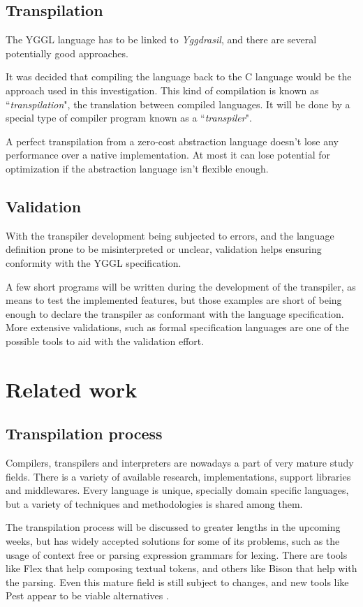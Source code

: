 \documentclass[runningheads]{llncs}
\begin{document}
\subsection{Transpilation}
The YGGL language has to be linked to \textit{Yggdrasil}, and there are several potentially good approaches.
\par It was decided that compiling the language back to the C language would be the approach used in this investigation. This kind of compilation is known as ``\textit{transpilation}", the translation between compiled languages. It will be done by a special type of compiler program known as a ``\textit{transpiler}".
\par A perfect transpilation from a zero-cost abstraction language doesn't lose any performance over a native implementation. At most it can lose potential for optimization if the abstraction language isn't flexible enough.
\subsection{Validation}
With the transpiler development being subjected to errors, and the language definition prone to be misinterpreted or unclear, validation helps ensuring conformity with the YGGL specification.
\par A few short programs will be written during the development of the transpiler, as means to test the implemented features, but those examples are short of being enough to declare the transpiler as conformant with the language specification. More extensive validations, such as formal specification languages are one of the possible tools to aid with the validation effort.
\clearpage

\section{Related work}
\subsection*{Transpilation process}
Compilers, transpilers and interpreters are nowadays a part of very mature study fields. There is a variety of available research, implementations, support libraries and middlewares. Every language is unique, specially domain specific languages, but a variety of techniques and methodologies is shared among them.
\par The transpilation process will be discussed to greater lengths in the upcoming weeks, but has widely accepted solutions for some of its problems, such as the usage of context free or parsing expression grammars for lexing. There are tools like Flex that help composing textual tokens, and others like Bison that help with the parsing. Even this mature field is still subject to changes, and new tools like Pest appear to be viable alternatives \cite{AppelModernCompiler:1997,FlexBisonLevine:2009,Pest:2019}.
\end{document}
